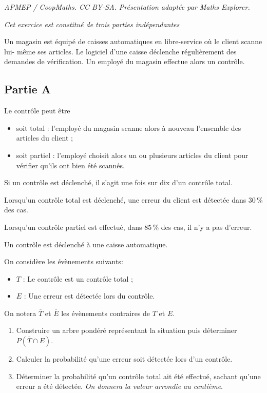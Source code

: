 \documentclass[10pt]{article}
\begin{document}
\noindent\textit{APMEP / CoopMaths. CC BY-SA. Présentation adaptée par Maths Explorer.}\par\medskip
\emph{Cet exercice est constitué de trois parties indépendantes}

\medskip

Un magasin est équipé de caisses automatiques en libre-service où le client scanne lui- même ses articles. Le logiciel d'une caisse déclenche régulièrement des demandes de vérification. Un employé du magasin effectue alors un contrôle.

\subsection*{Partie A}

Le contrôle peut être

\begin{itemize}[label=$\bullet~$]
\item soit \og total \fg{} : l'employé du magasin scanne alors à nouveau l'ensemble des
articles du client ;
\item soit \og partiel\fg{} : l'employé choisit alors un ou plusieurs articles du client pour vérifier
qu'ils ont bien été scannés.
\end{itemize}

Si un contrôle est déclenché, il s'agit une fois sur dix d'un contrôle total.

Lorsqu'un contrôle total est déclenché, une erreur du client est détectée dans 30\,\% des cas.

Lorsqu'un contrôle partiel est effectué, dans $85\,\%$ des cas, il n'y a pas d'erreur.

\medskip

Un contrôle est déclenché à une caisse automatique. 

On considère les évènements suivants:

\begin{itemize}[label=$\bullet~$]
\item $T$ : \og Le contrôle est un contrôle total \fg ;
\item $E$ : \og Une erreur est détectée lors du contrôle\fg.
\end{itemize}

On notera $\overline{T}$ et $\overline{E}$ les évènements contraires de $T$ et $E$.

\medskip

\begin{enumerate}
\item Construire un arbre pondéré représentant la situation puis déterminer $P\left(\overline{T} \cap E\right)$.
\item Calculer la probabilité qu'une erreur soit détectée lors d'un contrôle.
\item Déterminer la probabilité qu'un contrôle total ait été effectué, sachant qu'une erreur
a été détectée. \emph{On donnera la valeur arrondie au centième}.
\end{enumerate}
\end{document}
